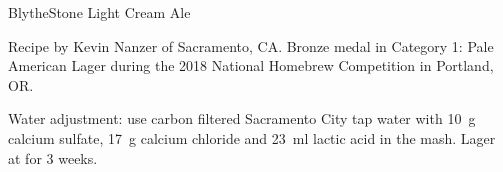 \begin{recipe}{BlytheStone Light Cream Ale}

\begin{aboutblock}
Recipe by Kevin Nanzer of Sacramento, CA. Bronze medal in Category 1: Pale American
Lager during the 2018 National Homebrew Competition in Portland, OR. \sourceaha
\end{aboutblock}


\begin{methodandtiming}

\begin{mashsteps}
\end{mashsteps}

\begin{fermentationsteps}
\end{fermentationsteps}

\begin{directions}
Water adjustment: use carbon filtered Sacramento City tap water with 10~g
calcium sulfate, 17~g calcium chloride and 23~ml lactic acid in the mash.
Lager at  for 3 weeks.
\end{directions}

\end{methodandtiming}

\recipebreak

\begin{ingredientsblock}

\begin{malts}
\end{malts}

\begin{hops}
\end{hops}


\end{ingredientsblock}

\end{recipe}

